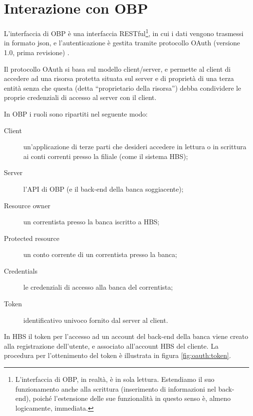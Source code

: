 
\section{Interazione con OBP}

L'interfaccia di OBP è una interfaccia RESTful\footnote{L'interfaccia di OBP, in realtà, è in sola lettura. Estendiamo il suo funzionamento anche alla scrittura (inserimento di informazioni nel back-end), poiché l'estensione delle sue funzionalità in questo senso è, almeno logicamente, immediata.}, in cui i dati vengono trasmessi in formato json, e l'autenticazione è gestita tramite protocollo OAuth (versione 1.0, prima revisione) \cite{oauthrfc}.

Il protocollo OAuth si basa sul modello client/server, e permette al client di accedere ad una risorsa protetta situata sul server e di propriet\`a di una terza entit\`a senza che questa (detta ``proprietario della risorsa'') debba condividere le proprie credenziali di accesso al server con il client.

In OBP i ruoli sono ripartiti nel seguente modo:
\begin{description}
	\item[Client] un'applicazione di terze parti che desideri accedere in lettura o in scrittura ai conti correnti presso la filiale (come il sistema HBS);
	\item[Server] l'API di OBP (e il back-end della banca soggiacente);
	\item[Resource owner] un correntista presso la banca iscritto a HBS;
	\item[Protected resource] un conto corrente di un correntista presso la banca;
	\item[Credentials] le credenziali di accesso alla banca del correntista;
	\item[Token] identificativo univoco fornito dal server al client.
\end{description}

In HBS il token per l'accesso ad un account del back-end della banca viene creato alla registrazione dell'utente, e associato all'account HBS del cliente.
La procedura per l'ottenimento del token \`e illustrata in figura \ref{fig:oauth:token}.

